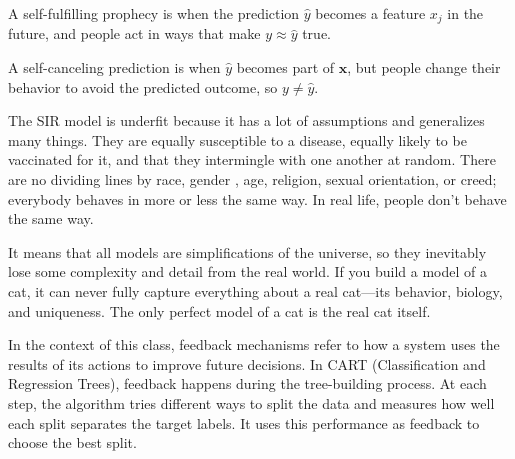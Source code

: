 \documentclass[12pt]{article}
\begin{document}
\begin{enumerate}
A self-fulfilling prophecy is when the prediction $\hat{y}$ becomes a feature $x_j$ in the future, and people act in ways that make $y \approx \hat{y}$ true.

A self-canceling prediction is when $\hat{y}$ becomes part of $\mathbf{x}$, but people change their behavior to avoid the predicted outcome, so $y \ne \hat{y}$.


The SIR model is underfit because it has a lot of assumptions and generalizes many things. They are equally susceptible to a disease, equally likely to be vaccinated for it, and that they intermingle with one another at random. There are no dividing lines by race, gender , age, religion, sexual orientation, or creed; everybody behaves in more or less the same way. In real life, people don't behave the same way.


It means that all models are simplifications of the universe, so they inevitably lose some complexity and detail from the real world. If you build a model of a cat, it can never fully capture everything about a real cat—its behavior, biology, and uniqueness. The only perfect model of a cat is the real cat itself.


In the context of this class, feedback mechanisms refer to how a system uses the results of its actions to improve future decisions. In CART (Classification and Regression Trees), feedback happens during the tree-building process. At each step, the algorithm tries different ways to split the data and measures how well each split separates the target labels. It uses this performance as feedback to choose the best split. 



\end{enumerate}
\end{document}
